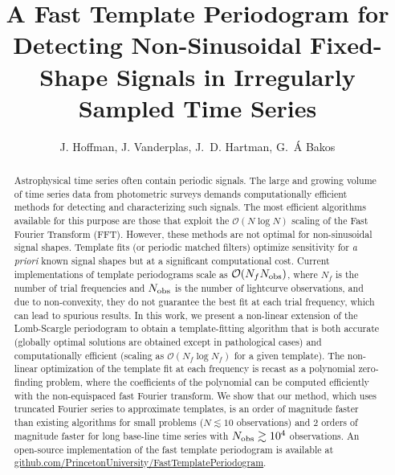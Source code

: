 \documentclass[apj]{emulateapj}
\newcommand{\bigO}{\mathcal{O}}
\begin{document}
\title{A Fast Template Periodogram for Detecting Non-Sinusoidal Fixed-Shape Signals in Irregularly Sampled Time Series}

\author{J. Hoffman,
J. Vanderplas,
J.~D. Hartman,
G.~\'A Bakos}


\begin{abstract}
    Astrophysical time series often contain periodic signals. The large and growing volume of time series data from
    photometric surveys demands computationally efficient methods for detecting and characterizing such signals.
    The most efficient algorithms available for this purpose are those that exploit the
    $\bigO(N\log N)$ scaling of the Fast Fourier Transform (FFT). However, these methods are not optimal
    for non-sinusoidal signal shapes. Template fits (or periodic matched filters) optimize
    sensitivity for \emph{a priori} known signal shapes but at a significant computational cost. Current
    implementations of template periodograms scale as $\bigO(N_f N_{\rm obs})$, where $N_f$ is the number
    of trial frequencies and $N_{\rm obs}$ is the number of lightcurve observations, and due to non-convexity, they do not
    guarantee the best fit at each trial frequency, which can lead to spurious results. In this work, we present a non-linear extension of the Lomb-Scargle
    periodogram to obtain a template-fitting algorithm that is both accurate (globally optimal solutions are
    obtained except in pathological cases) and computationally efficient (scaling as $\bigO(N_f\log N_f)$ for a given template).
    The non-linear optimization of the template fit at each frequency is recast as a polynomial
    zero-finding problem, where the coefficients of the polynomial can be computed efficiently with
    the non-equispaced fast Fourier transform. We show that our method, which uses truncated Fourier series to approximate templates,
    is an order of magnitude faster than existing algorithms for small problems ($N\lesssim 10$ observations) and
    2 orders of magnitude faster for long base-line time series with $N_{\rm obs} \gtrsim 10^4$ observations.
    An open-source implementation of the fast template periodogram is available at
    \href{https://www.github.com/PrincetonUniversity/FastTemplatePeriodogram}{github.com/PrincetonUniversity/FastTemplatePeriodogram}.
\end{abstract}
\end{document}

